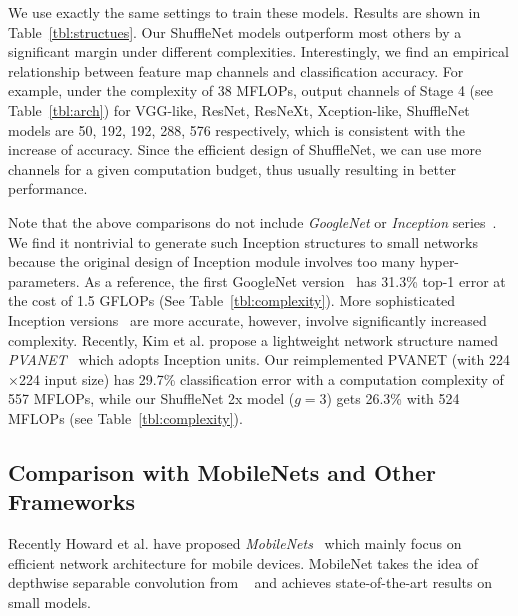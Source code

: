 \documentclass[10pt,twocolumn,letterpaper]{article}
\begin{document}
We use exactly the same settings to train these models. Results are shown in Table~\ref{tbl:structues}. Our ShuffleNet models outperform most others by a significant margin under different complexities. Interestingly, we find an empirical relationship between feature map channels and classification accuracy. For example, under the complexity of 38 MFLOPs, output channels of Stage 4 (see Table~\ref{tbl:arch}) for VGG-like, ResNet, ResNeXt, Xception-like, ShuffleNet models are 50, 192, 192, 288, 576 respectively, which is consistent with the increase of accuracy. Since the efficient design of ShuffleNet, we can use more channels for a given computation budget, thus usually resulting in better performance.



Note that the above comparisons do not include \emph{GoogleNet} or \emph{Inception} series~\cite{szegedy2015going,szegedy2016rethinking,szegedy2016inception}. We find it nontrivial to generate such Inception structures to small networks because the original design of Inception module involves too many hyper-parameters. As a reference, the first GoogleNet version~\cite{szegedy2015going} has 31.3\% top-1 error at the cost of 1.5 GFLOPs (See Table~\ref{tbl:complexity}). More sophisticated Inception versions~\cite{szegedy2016rethinking,szegedy2016inception} are more accurate, however, involve significantly increased complexity. Recently, Kim et al. propose a lightweight network structure named \emph{PVANET}~\cite{kim2016pvanet} which adopts Inception units. Our reimplemented PVANET (with 224$\times$224 input size) has 29.7\% classification error with a computation complexity of 557 MFLOPs, while our ShuffleNet 2x model ($g=3$) gets 26.3\% with 524 MFLOPs (see Table~\ref{tbl:complexity}). 
\subsection{Comparison with MobileNets and Other Frameworks}
\label{sec:compmobile}



Recently Howard et al. have proposed \emph{MobileNets}~\cite{howard2017mobilenets} which mainly focus on efficient network architecture for mobile devices. MobileNet takes the idea of depthwise separable convolution from ~\cite{chollet2016xception} and achieves state-of-the-art results on small models.
\end{document}
